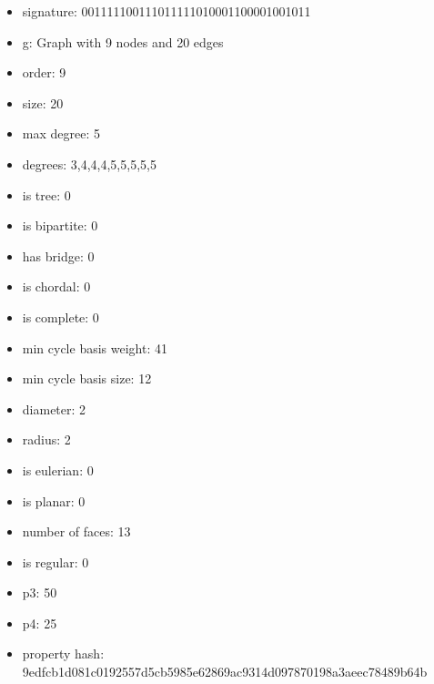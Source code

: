 \newpage
\begin{figure}
\end{figure}
\begin{itemize}
\item signature: 001111100111011111010001100001001011
\item g: Graph with 9 nodes and 20 edges
\item order: 9
\item size: 20
\item max degree: 5
\item degrees: 3,4,4,4,5,5,5,5,5
\item is tree: 0
\item is bipartite: 0
\item has bridge: 0
\item is chordal: 0
\item is complete: 0
\item min cycle basis weight: 41
\item min cycle basis size: 12
\item diameter: 2
\item radius: 2
\item is eulerian: 0
\item is planar: 0
\item number of faces: 13
\item is regular: 0
\item p3: 50
\item p4: 25
\item property hash: 9edfcb1d081c0192557d5cb5985e62869ac9314d097870198a3aeec78489b64b
\end{itemize}
